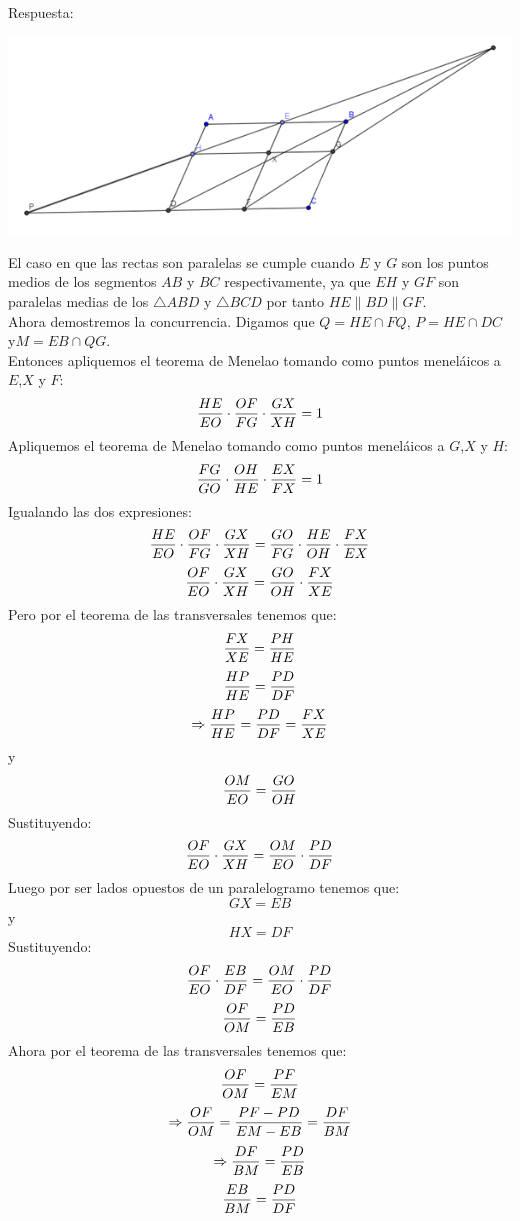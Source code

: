 \documentclass{book}
\begin{document}
\begin{enumerate}
          Respuesta:
          \begin{center}
              \includegraphics[scale=1]{imagenes/Geometria/14.png}
          \end{center}
          El caso en que las rectas son paralelas se cumple cuando $E$ y $G$ son los puntos medios de los segmentos $AB$ y $BC$ respectivamente, ya que $EH$ y $GF$ son paralelas medias de los $\triangle ABD$ y $\triangle BCD$ por tanto $HE\parallel BD\parallel GF$.\\
          Ahora demostremos la concurrencia. Digamos que $Q=HE\cap FQ$, $P=HE\cap DC$ y$ M=EB\cap QG$.\\
          Entonces apliquemos el teorema de Menelao tomando como puntos meneláicos a $E$,$X$ y $F$:
          $${HE\over EO}\cdot{OF\over FG}\cdot{GX\over XH}=1$$
          Apliquemos el teorema de Menelao tomando como puntos meneláicos a $G$,$X$ y $H$:
          $${FG\over GO}\cdot{OH\over HE}\cdot{EX\over FX}=1$$
          Igualando las dos expresiones:
          $${HE\over EO}\cdot{OF\over FG}\cdot{GX\over XH}={GO\over FG}\cdot{HE\over OH}\cdot{FX\over EX}$$
          $${OF\over EO}\cdot{GX\over XH}={GO\over OH}\cdot{FX\over XE}$$
          Pero por el teorema de las transversales tenemos que:
          $${FX\over XE}={PH\over HE}$$
          $${HP\over HE}={PD\over DF}$$
          $$\Rightarrow{HP\over HE}={PD\over DF}={FX\over XE}$$
          y
          $${OM\over EO}={GO\over OH}$$
          Sustituyendo:
          $${OF\over EO}\cdot{GX\over XH}={OM\over EO}\cdot{PD\over DF}$$
          Luego por ser lados opuestos de un paralelogramo tenemos que:
          $$GX=EB$$
          y
          $$HX=DF$$
          Sustituyendo:
          $${OF\over EO}\cdot{EB\over DF}={OM\over EO}\cdot{PD\over DF}$$
          $${OF\over OM}={PD\over EB}$$
          Ahora por el teorema de las transversales tenemos que:
          $${OF\over OM}={PF\over EM}$$
          $$\Rightarrow{OF\over OM}=\frac{PF-PD}{EM-EB}={DF\over BM}$$
          $$\Rightarrow{DF\over BM}={PD\over EB}$$
          $${EB\over BM}={PD\over DF}$$

\end{enumerate}
\end{document}
